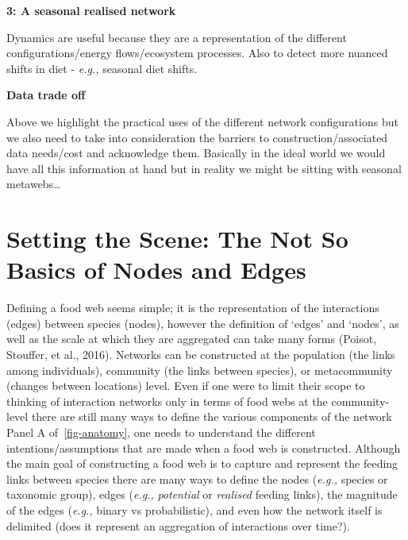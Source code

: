 \documentclass[
]{article}
\begin{document}
\begin{tcolorbox}
\textbf{3: A seasonal realised network}

Dynamics are useful because they are a representation of the different
configurations/energy flows/ecosystem processes. Also to detect more
nuanced shifts in diet - \emph{e.g.,} seasonal diet shifts.

\textbf{Data trade off}

Above we highlight the practical uses of the different network
configurations but we also need to take into consideration the barriers
to construction/associated data needs/cost and acknowledge them.
Basically in the ideal world we would have all this information at hand
but in reality we might be sitting with seasonal metawebs\ldots{}

\end{tcolorbox}

\section{Setting the Scene: The Not So Basics of Nodes and
Edges}\label{sec-anatomy}

Defining a food web seems simple; it is the representation of the
interactions (edges) between species (nodes), however the definition of
`edges' and `nodes', as well as the scale at which they are aggregated
can take many forms (Poisot, Stouffer, et al., 2016). Networks can be
constructed at the population (the links among individuals), community
(the links between species), or metacommunity (changes between
locations) level. Even if one were to limit their scope to thinking of
interaction networks only in terms of food webs at the community-level
there are still many ways to define the various components of the
network Panel A of~\ref{fig-anatomy}, one needs to understand the
different intentions/assumptions that are made when a food web is
constructed. Although the main goal of constructing a food web is to
capture and represent the feeding links between species there are many
ways to define the nodes (\emph{e.g.,} species or taxonomic group),
edges (\emph{e.g.,} \emph{potential} or \emph{realised} feeding links),
the magnitude of the edges (\emph{e.g.,} binary vs probabilistic), and
even how the network itself is delimited (does it represent an
aggregation of interactions over time?).
\end{document}
